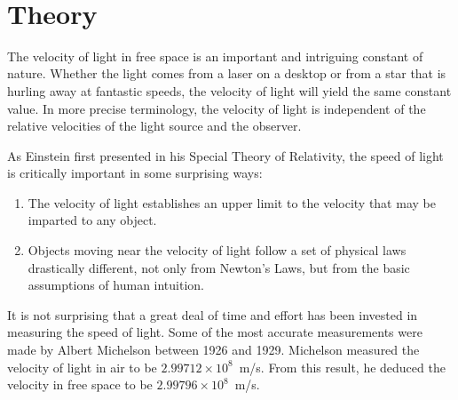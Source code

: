 \documentclass{tufte-handout}
\begin{document}



\vspace{0.5cm}
\\
\vspace{0.5cm}


%
%

\section{Theory}

The velocity of light in free space is an important and intriguing 
constant of nature. Whether the light comes from a laser on a desktop 
or from a star that is hurling away at fantastic speeds, the velocity of 
light will yield the same constant value. In more precise terminology, 
the velocity of light is independent of the relative velocities of the light 
source and the observer. 

As Einstein first presented in his Special Theory of Relativity, the 
speed of light is critically important in some surprising ways: 
\begin{enumerate}
\item The velocity of light establishes an upper limit to the velocity that 
may be imparted to any object.
\item Objects moving near the velocity of light follow a set of physical 
laws drastically different, not only from Newton's Laws, but from 
the basic assumptions of human intuition.
\end{enumerate}

It is not surprising that a great deal of time and effort has been invested 
in measuring the speed of light. Some of the most accurate 
measurements were made by Albert Michelson between 1926 and 
1929. Michelson measured the velocity of light in air to be $2.99712\times10^8$~m/s. From this result, he deduced the velocity in free space to be $2.99796 \times 10^8$~m/s.
\end{document}
